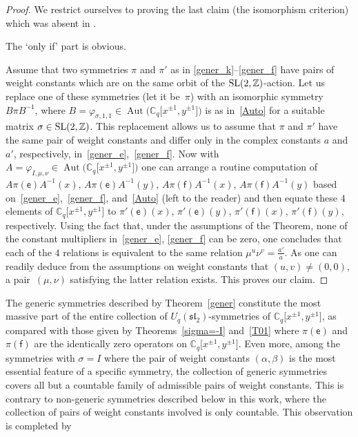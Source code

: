 \documentclass[10pt,a4paper]{amsart}
\numberwithin{equation}{section}
\begin{document}
\begin{proof} We restrict ourselves to proving the last claim (the isomorphism criterion) which was absent in \cite[Theorem 4.1]{S}.

The `only if' part is obvious.

Assume that two symmetries $\pi$ and $\pi'$ as in \eqref{gener_k}--\eqref{gener_f} have pairs of weight constants which are on the same orbit of the ${\rm SL}(2,\mathbb{Z})$-action. Let us replace one of these symmetries (let it be~$\pi$) with an isomorphic symmetry $B\pi B^{-1}$, where $B=\varphi_{\sigma,1,1}\in\operatorname{Aut}\big(\mathbb{C}_q\big[x^{\pm 1},y^{\pm 1}\big]\big)$ is as in~\eqref{Auto} for a suitable matrix $\sigma\in {\rm SL}(2,\mathbb{Z})$. This replacement allows us to assume that $\pi$ and $\pi'$ have the same pair of weight constants and differ only in the complex constants $a$ and $a'$, respectively, in~\eqref{gener_e},~\eqref{gener_f}. Now with $A=\varphi_{I,\mu,\nu}\in\operatorname{Aut}\big(\mathbb{C}_q\big[x^{\pm 1},y^{\pm 1}\big]\big)$ one can arrange a routine computation of $A\pi(\mathsf{e})A^{-1}(x)$, $A\pi(\mathsf{e})A^{-1}(y)$, $A\pi(\mathsf{f})A^{-1}(x)$, $A\pi(\mathsf{f})A^{-1}(y)$ based on~\eqref{gener_e},~\eqref{gener_f}, and~\eqref{Auto} (left to the reader) and then equate these $4$ elements of $\mathbb{C}_q\big[x^{\pm 1},y^{\pm 1}\big]$ to $\pi'(\mathsf{e})(x)$, $\pi'(\mathsf{e})(y)$, $\pi'(\mathsf{f})(x)$, $\pi'(\mathsf{f})(y)$, respectively. Using the fact that, under the assumptions of the Theorem, none of the constant multipliers in~\eqref{gener_e}, \eqref{gener_f} can be zero, one concludes that each of the $4$ relations is equivalent to the same relation $\mu^u\nu^v=\frac{a'}a$. As one can readily deduce from the assumptions on weight constants that $(u,v)\ne(0,0)$, a pair~$(\mu,\nu)$ satisfying the latter relation exists. This proves our claim.
\end{proof}

\begin{Remark}The generic symmetries described by Theorem~\ref{gener} constitute the most massive part of the entire collection of $U_q(\mathfrak{sl}_2)$-symmetries of $\mathbb{C}_q\big[x^{\pm 1},y^{\pm 1}\big]$, as compared with those given by Theorems~\ref{sigma=-I} and~\ref{T01} where $\pi(\mathsf{e})$ and $\pi(\mathsf{f})$ are the identically zero operators on $\mathbb{C}_q\big[x^{\pm 1},y^{\pm 1}\big]$. Even more, among the symmetries with $\sigma=I$ where the pair of weight constants $(\alpha,\beta)$ is the most essential feature of a specific symmetry, the collection of generic symmetries covers all but a countable family of admissible pairs of weight constants. This is contrary to non-generic symmetries described below in this work, where the collection of pairs of weight constants involved is only countable. This observation is completed by
\end{Remark}
\end{document}
